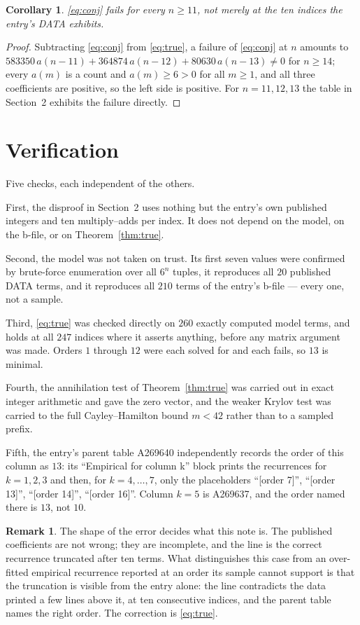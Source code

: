 \documentclass[11pt,a4paper]{article}
\theoremstyle{plain}
\newtheorem{corollary}[theorem]{Corollary}
\theoremstyle{definition}
\newtheorem{remark}[theorem]{Remark}
\begin{document}
\begin{corollary}
\eqref{eq:conj} fails for every $n\ge11$, not merely at the ten indices the entry's DATA
exhibits.
\end{corollary}

\begin{proof}
Subtracting \eqref{eq:conj} from \eqref{eq:true}, a failure of \eqref{eq:conj} at $n$
amounts to
$583350\,a(n-11)+364874\,a(n-12)+80630\,a(n-13)\ne0$ for $n\ge14$; every $a(m)$ is a
count and $a(m)\ge6>0$ for all $m\ge1$, and all three coefficients are positive, so the
left side is positive. For $n=11,12,13$ the table in Section~2 exhibits the failure
directly.
\end{proof}

\section{Verification}

Five checks, each independent of the others.

First, the disproof in Section~2 uses nothing but the entry's own published integers and
ten multiply--adds per index. It does not depend on the model, on the b-file, or on
Theorem~\ref{thm:true}.

Second, the model was not taken on trust. Its first seven values were confirmed by
brute-force enumeration over all $6^{n}$ tuples, it reproduces all $20$ published DATA
terms, and it reproduces all $210$ terms of the entry's b-file --- every one, not a
sample.

Third, \eqref{eq:true} was checked directly on $260$ exactly computed model terms, and
holds at all $247$ indices where it asserts anything, before any matrix argument was
made. Orders $1$ through $12$ were each solved for and each fails, so $13$ is minimal.

Fourth, the annihilation test of Theorem~\ref{thm:true} was carried out in exact integer
arithmetic and gave the zero vector, and the weaker Krylov test was carried to the full
Cayley--Hamilton bound $m<42$ rather than to a sampled prefix.

Fifth, the entry's parent table A269640 independently records the order of this column
as $13$: its ``Empirical for column k'' block prints the recurrences for $k=1,2,3$ and
then, for $k=4,\dots,7$, only the placeholders ``[order 7]'', ``[order 13]'', ``[order
14]'', ``[order 16]''. Column $k=5$ is A269637, and the order named there is $13$, not
$10$.

\begin{remark}
The shape of the error decides what this note is. The published coefficients are not
wrong; they are incomplete, and the line is the correct recurrence truncated after ten
terms. What distinguishes this case from an over-fitted empirical recurrence reported at
an order its sample cannot support is that the truncation is visible from the entry
alone: the line contradicts the data printed a few lines above it, at ten consecutive
indices, and the parent table names the right order. The correction is \eqref{eq:true}.
\end{remark}
\end{document}
